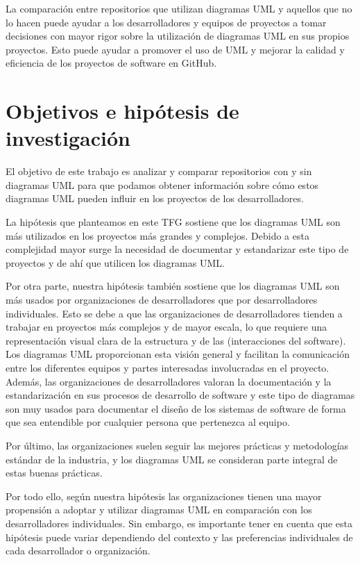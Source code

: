 \documentclass[a4paper, 12pt]{book}
\begin{document}
La comparación entre repositorios que utilizan diagramas UML y aquellos que no lo hacen puede ayudar a los desarrolladores y equipos de proyectos a tomar decisiones con mayor rigor sobre la utilización de diagramas UML en sus propios proyectos.
Esto puede ayudar a promover el uso de UML y mejorar la calidad y eficiencia de los proyectos de software en GitHub.


\section{Objetivos e hipótesis de investigación} %
\label{sec:bbjetivos e hipótesis de investigación} %


El objetivo de este trabajo es analizar y comparar repositorios con y sin diagramas UML para que podamos obtener información sobre cómo estos diagramas UML pueden influir en los proyectos de los desarrolladores. 


La hipótesis que planteamos en este TFG sostiene que los diagramas UML son más utilizados en los proyectos más grandes y complejos.
Debido a esta complejidad mayor surge la necesidad de documentar y estandarizar este tipo de proyectos y de ahí que utilicen los diagramas UML.


Por otra parte, nuestra hipótesis también sostiene que los diagramas UML son más usados por organizaciones de desarrolladores que por desarrolladores individuales.
Esto se debe a que las organizaciones de desarrolladores tienden a trabajar en proyectos más complejos y de mayor escala, lo que requiere una representación visual clara de la estructura y de las (interacciones del software).
Los diagramas UML proporcionan esta visión general y facilitan la comunicación entre los diferentes equipos y partes interesadas involucradas en el proyecto.
Además, las organizaciones de desarrolladores valoran la documentación y la estandarización en sus procesos de desarrollo de software y este tipo de diagramas son muy usados para documentar el diseño de los sistemas de software de forma que sea entendible por cualquier persona que pertenezca al equipo.


Por último, las organizaciones suelen seguir las mejores prácticas y metodologías estándar de la industria, y los diagramas UML se consideran parte integral de estas buenas prácticas. 


Por todo ello, según nuestra hipótesis las organizaciones tienen una mayor propensión a adoptar y utilizar diagramas UML en comparación con los desarrolladores individuales. 
Sin embargo, es importante tener en cuenta que esta hipótesis puede variar dependiendo del contexto y las preferencias individuales de cada desarrollador o organización.
\end{document}
